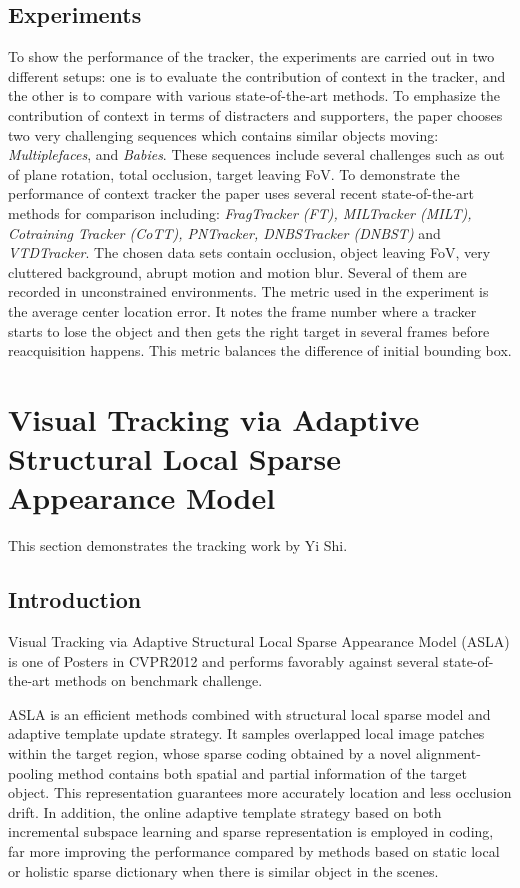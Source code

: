 \documentclass{article}
\begin{document}
\subsection{Experiments}
    To show the performance of the tracker, the experiments are carried out in two different setups: one is to evaluate the contribution of context in the tracker, and the other is to compare with various state-of-the-art methods.
    \newline
    To emphasize the contribution of context in terms of distracters and supporters, the paper chooses two very challenging sequences which contains similar objects moving:  \textit{Multiplefaces}, and  \textit{Babies}. These sequences include several challenges such as out of plane rotation, total occlusion, target leaving FoV.
    \newline
    To demonstrate the performance of context tracker the paper uses several recent state-of-the-art methods for comparison including: \textit{FragTracker (FT), MILTracker (MILT), Cotraining Tracker (CoTT), PNTracker, DNBSTracker (DNBST)} and \textit{VTDTracker}. The chosen data sets contain occlusion, object leaving FoV, very cluttered background, abrupt motion and motion blur. Several of them are recorded in unconstrained environments. The metric used in the experiment is the average center location error. It notes the frame number where a tracker starts to lose the object and then gets the right target in several frames before reacquisition happens. This metric balances the difference of initial bounding box.

\section{Visual Tracking via Adaptive Structural Local Sparse Appearance Model}
This section demonstrates the tracking work by Yi Shi.
\subsection{Introduction}
Visual Tracking via Adaptive Structural Local Sparse Appearance Model (ASLA) is one of Posters in CVPR2012 and performs favorably against several state-of-the-art methods on benchmark challenge.

ASLA is an efficient methods combined with structural local sparse model and adaptive template update strategy. It samples overlapped local image patches within the target region, whose sparse coding obtained by a novel alignment-pooling method contains both spatial and partial information of the target object. This representation guarantees more accurately location and less occlusion drift. In addition, the online adaptive template strategy based on both incremental subspace learning and sparse representation is employed in coding, far more improving the performance compared by methods based on static local or holistic sparse dictionary when there is similar object in the scenes.
\end{document}
